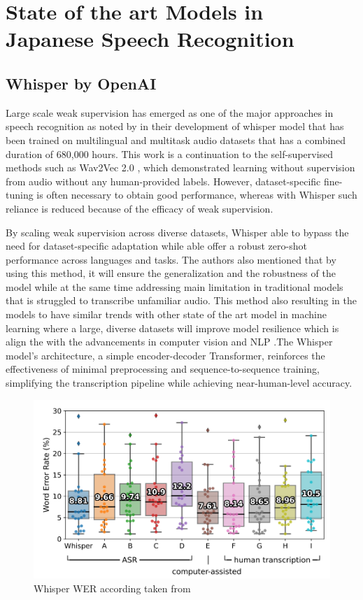 \section{State of the art Models in Japanese Speech Recognition}
\subsection{Whisper by OpenAI}
Large scale weak supervision has emerged as one of the major approaches in speech recognition as noted by \textcite{radford2023robust} in their development of whisper model that has been trained on multilingual and multitask audio datasets that has a combined duration of 680,000 hours. This work is a continuation to the self-supervised methods such as Wav2Vec 2.0 \parencite{baevski2020wav2vec}, which demonstrated learning without supervision from audio without any human-provided labels. However, dataset-specific fine-tuning is often necessary to obtain good performance, whereas with Whisper such reliance is reduced because of the efficacy of weak supervision. 

By scaling weak supervision across diverse datasets, Whisper able to bypass the need for dataset-specific adaptation while able offer a robust zero-shot performance across languages and tasks. The authors also mentioned that by using this method, it will ensure the generalization and the robustness of the model while at the same time addressing main limitation in traditional models that is struggled to transcribe unfamiliar audio. This method also resulting in the models to have similar trends with other state of the art model in machine learning where a large, diverse datasets will improve model resilience which is align the with the advancements in computer vision \parencite{kolesnikov2020big} and NLP \parencite{radford2019language}.The Whisper model’s architecture, a simple encoder-decoder Transformer, reinforces the effectiveness of minimal preprocessing and sequence-to-sequence training, simplifying the transcription pipeline while achieving near-human-level accuracy.

\begin{figure}[!ht]
    \centering
    \includegraphics[width=.9\textwidth]{mainmatter//images/image.png}
    \caption{Whisper WER according taken from \cite{radford2023robust}}
\end{figure}

